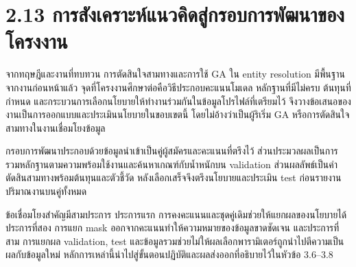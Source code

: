 \documentclass[12pt,a4paper]{report}
\begin{document}
\section*{2.13 การสังเคราะห์แนวคิดสู่กรอบการพัฒนาของโครงงาน}
จากทฤษฎีและงานที่ทบทวน การตัดสินใจสามทางและการใช้ GA ใน entity resolution มีพื้นฐานจากงานก่อนหน้าแล้ว จุดที่โครงงานศึกษาต่อคือวิธีประกอบคะแนนโมเดล หลักฐานที่มีไม่ครบ ต้นทุนที่กำหนด และกระบวนการเลือกนโยบายให้ทำงานร่วมกันในข้อมูลโปรไฟล์ที่เตรียมไว้ จึงวางข้อเสนอของงานเป็นการออกแบบและประเมินนโยบายในขอบเขตนี้ โดยไม่อ้างว่าเป็นผู้ริเริ่ม GA หรือการตัดสินใจสามทางในงานเชื่อมโยงข้อมูล

กรอบการพัฒนาประกอบด้วยข้อมูลนำเข้าเป็นคู่ผู้สมัครและคะแนนที่ตรึงไว้ ส่วนประมวลผลเป็นการรวมหลักฐานตามความพร้อมใช้งานและค้นหาเกณฑ์กับน้ำหนักบน validation ส่วนผลลัพธ์เป็นคำตัดสินสามทางพร้อมต้นทุนและตัวชี้วัด หลังเลือกเสร็จจึงตรึงนโยบายและประเมิน test ก่อนรายงานปริมาณงานบนคู่ทั้งหมด

ข้อเชื่อมโยงสำคัญมีสามประการ ประการแรก การคงคะแนนและชุดคู่เดิมช่วยให้แยกผลของนโยบายได้ ประการที่สอง การแยก mask ออกจากคะแนนทำให้ความหมายของข้อมูลขาดชัดเจน และประการที่สาม การแยกผล validation, test และข้อมูลรวมช่วยไม่ให้ผลเลือกพารามิเตอร์ถูกนำไปตีความเป็นผลกับข้อมูลใหม่ หลักการเหล่านี้นำไปสู่ขั้นตอนปฏิบัติและผลส่งออกที่อธิบายไว้ในหัวข้อ 3.6--3.8

\clearpage
\end{document}
